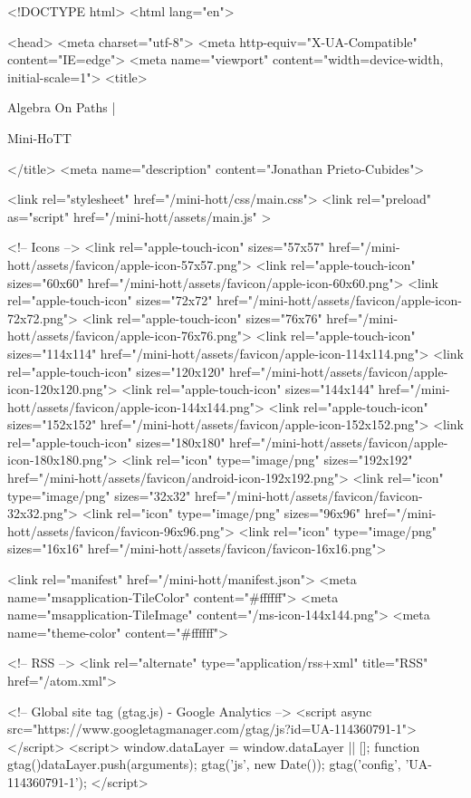 <!DOCTYPE html>
<html lang="en">

<head>
  <meta charset="utf-8">
  <meta http-equiv="X-UA-Compatible" content="IE=edge">
  <meta name="viewport" content="width=device-width, initial-scale=1">
  <title>
    
      
        Algebra On Paths |
      
        Mini-HoTT
    
  </title>
  <meta name="description" content="Jonathan Prieto-Cubides">

  <link rel="stylesheet" href="/mini-hott/css/main.css">
  <link rel="preload" as="script" href="/mini-hott/assets/main.js" >

  <!-- Icons -->
  <link rel="apple-touch-icon" sizes="57x57" href="/mini-hott/assets/favicon/apple-icon-57x57.png">
  <link rel="apple-touch-icon" sizes="60x60" href="/mini-hott/assets/favicon/apple-icon-60x60.png">
  <link rel="apple-touch-icon" sizes="72x72" href="/mini-hott/assets/favicon/apple-icon-72x72.png">
  <link rel="apple-touch-icon" sizes="76x76" href="/mini-hott/assets/favicon/apple-icon-76x76.png">
  <link rel="apple-touch-icon" sizes="114x114" href="/mini-hott/assets/favicon/apple-icon-114x114.png">
  <link rel="apple-touch-icon" sizes="120x120" href="/mini-hott/assets/favicon/apple-icon-120x120.png">
  <link rel="apple-touch-icon" sizes="144x144" href="/mini-hott/assets/favicon/apple-icon-144x144.png">
  <link rel="apple-touch-icon" sizes="152x152" href="/mini-hott/assets/favicon/apple-icon-152x152.png">
  <link rel="apple-touch-icon" sizes="180x180" href="/mini-hott/assets/favicon/apple-icon-180x180.png">
  <link rel="icon" type="image/png" sizes="192x192"  href="/mini-hott/assets/favicon/android-icon-192x192.png">
  <link rel="icon" type="image/png" sizes="32x32" href="/mini-hott/assets/favicon/favicon-32x32.png">
  <link rel="icon" type="image/png" sizes="96x96" href="/mini-hott/assets/favicon/favicon-96x96.png">
  <link rel="icon" type="image/png" sizes="16x16" href="/mini-hott/assets/favicon/favicon-16x16.png">

  <link rel="manifest" href="/mini-hott/manifest.json">
  <meta name="msapplication-TileColor" content="#ffffff">
  <meta name="msapplication-TileImage" content="/ms-icon-144x144.png">
  <meta name="theme-color" content="#ffffff">

  <!-- RSS -->
  <link rel="alternate" type="application/rss+xml" title="RSS" href="/atom.xml">

  <!-- Global site tag (gtag.js) - Google Analytics -->
  <script async src="https://www.googletagmanager.com/gtag/js?id=UA-114360791-1"></script>
  <script>
    window.dataLayer = window.dataLayer || [];
    function gtag(){dataLayer.push(arguments);}
    gtag('js', new Date());
    gtag('config', 'UA-114360791-1');
  </script>

